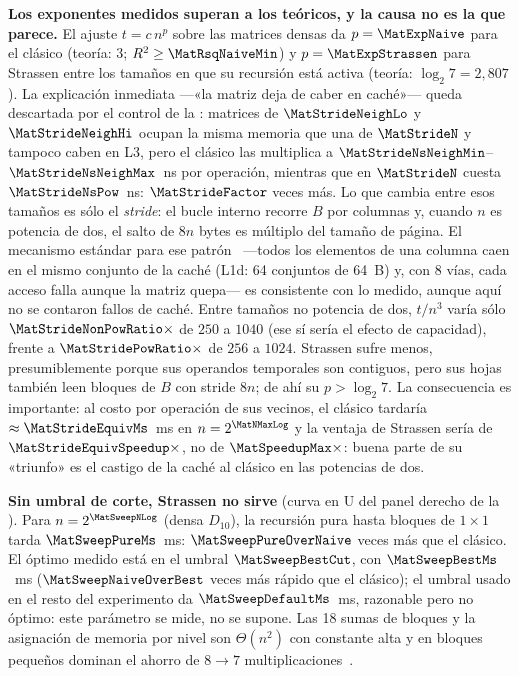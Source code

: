 \textbf{Los exponentes medidos superan a los teóricos, y la causa no es la que
parece.} El ajuste $t=c\,n^{p}$ sobre las matrices densas da $p=\MatExpNaive$
para el clásico (teoría: $3$; $R^{2}\ge\MatRsqNaiveMin$) y $p=\MatExpStrassen$
para Strassen entre los \MatExpStrassenPts{} tamaños en que su recursión está
activa (teoría: $\log_2 7=2{,}807$). La explicación inmediata —«la matriz deja
de caber en caché»— queda descartada por el control de la
: matrices de $\MatStrideNeighLo$ y $\MatStrideNeighHi$
ocupan la misma memoria que una de $\MatStrideN$ y tampoco caben en L3, pero
el clásico las multiplica a $\MatStrideNsNeighMin$--$\MatStrideNsNeighMax$~ns
por operación, mientras que en $\MatStrideN$ cuesta $\MatStrideNsPow$~ns:
$\MatStrideFactor$ veces más. Lo que cambia entre esos tamaños es sólo el
\emph{stride}: el bucle interno recorre $B$ por columnas y, cuando $n$ es
potencia de dos, el salto de $8n$ bytes es múltiplo del tamaño de página. El
mecanismo estándar para ese patrón~\cite{drepper2007} —todos los elementos de
una columna caen en el mismo conjunto de la caché (L1d: 64 conjuntos de 64~B)
y, con 8 vías, cada acceso falla aunque la matriz quepa— es consistente con lo
medido, aunque aquí no se contaron fallos de caché. Entre tamaños no potencia
de dos, $t/n^{3}$ varía sólo $\MatStrideNonPowRatio\times$ de $250$ a $1040$
(ese sí sería el efecto de capacidad), frente a $\MatStridePowRatio\times$ de
$256$ a $1024$. Strassen sufre menos,
presumiblemente porque sus operandos temporales son contiguos, pero sus hojas
también leen bloques de $B$ con stride $8n$; de ahí su $p>\log_2 7$. La
consecuencia es importante: al costo por operación de sus vecinos, el clásico
tardaría $\approx\MatStrideEquivMs$~ms en $n=2^{\MatNMaxLog}$ y la ventaja de
Strassen sería de $\MatStrideEquivSpeedup\times$, no de $\MatSpeedupMax\times$:
buena parte de su «triunfo» es el castigo de la caché al clásico en las
potencias de dos.

\textbf{Sin umbral de corte, Strassen no sirve} (curva en U del panel derecho
de la ). Para $n=2^{\MatSweepNLog}$ (densa $D_{10}$), la
recursión pura hasta bloques de $1\times1$ tarda $\MatSweepPureMs$~ms:
$\MatSweepPureOverNaive$ veces más que el clásico. El óptimo medido está en el
umbral $\MatSweepBestCut$, con $\MatSweepBestMs$~ms ($\MatSweepNaiveOverBest$
veces más rápido que el clásico); el umbral \MatCutoff{} usado en el resto del
experimento da $\MatSweepDefaultMs$~ms, razonable pero no óptimo: este
parámetro se mide, no se supone. Las 18 sumas de bloques y la asignación de
memoria por nivel son $\Theta(n^{2})$ con constante alta y en bloques pequeños
dominan el ahorro de $8\to7$ multiplicaciones~\cite{husslederman1996}.


